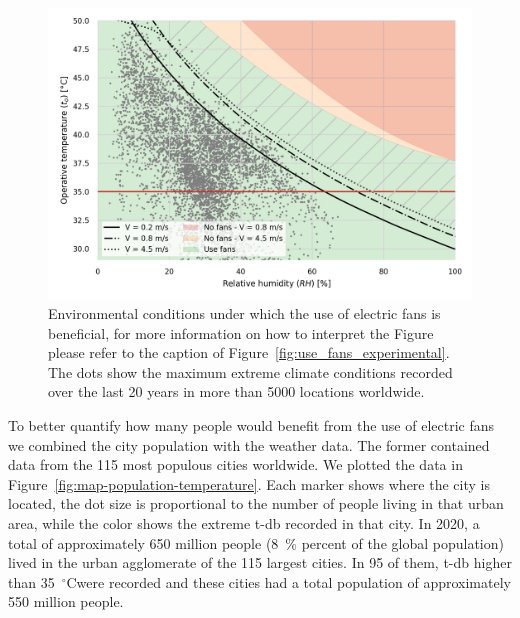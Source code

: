\begin{figure}[thb!]
    \centering
    \includegraphics[width=\textwidth]{figures/use_fans}
    \caption{Environmental conditions under which the use of electric fans is beneficial, for more information on how to interpret the Figure please refer to the caption of Figure~\ref{fig:use_fans_experimental}.
    The dots show the maximum extreme climate conditions recorded over the last 20 years in more than 5000 locations worldwide.}
    \label{fig:energy_storage_delta}
\end{figure}



To better quantify how many people would benefit from the use of electric fans we combined the city population with the weather data.
The former contained data from the 115 most populous cities worldwide.
We plotted the data in Figure~\ref{fig:map-population-temperature}.
Each marker shows where the city is located, the dot size is proportional to the number of people living in that urban area, while the color shows the extreme \ac{t-db} recorded in that city.
In 2020, a total of approximately 650 million people (8~\% percent of the global population) lived in the urban agglomerate of the 115 largest cities.
In 95 of them, \ac{t-db} higher than 35~$^{\circ}$C\@ were recorded and these cities had a total population of approximately 550 million people.

